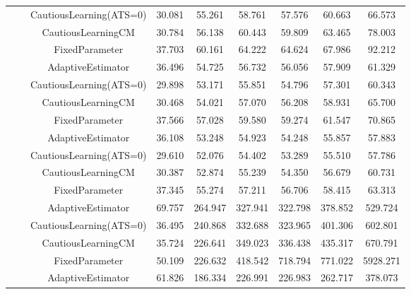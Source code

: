 \begin{table}[!h]
\begin{tabular}[t]{ccccccccc}
 &  & CautiousLearning(ATS=0) & 30.081 & 55.261 & 58.761 & 57.576 & 60.663 & 66.573\\

 &  & CautiousLearningCM & 30.784 & 56.138 & 60.443 & 59.809 & 63.465 & 78.003\\

 & \multirow[t]{-4}{*}{\centering\arraybackslash 1.00} & FixedParameter & 37.703 & 60.161 & 64.222 & 64.624 & 67.986 & 92.212\\
\cmidrule{2-9}
 &  & AdaptiveEstimator & 36.496 & 54.725 & 56.732 & 56.056 & 57.909 & 61.329\\

 &  & CautiousLearning(ATS=0) & 29.898 & 53.171 & 55.851 & 54.796 & 57.301 & 60.343\\

 &  & CautiousLearningCM & 30.468 & 54.021 & 57.070 & 56.208 & 58.931 & 65.700\\

 & \multirow[t]{-4}{*}{\centering\arraybackslash 1.25} & FixedParameter & 37.566 & 57.028 & 59.580 & 59.274 & 61.547 & 70.865\\
\cmidrule{2-9}
 &  & AdaptiveEstimator & 36.108 & 53.248 & 54.923 & 54.248 & 55.857 & 57.883\\

 &  & CautiousLearning(ATS=0) & 29.610 & 52.076 & 54.402 & 53.289 & 55.510 & 57.786\\

 &  & CautiousLearningCM & 30.387 & 52.874 & 55.239 & 54.350 & 56.679 & 60.731\\

\multirow[t]{-28}{*}{\centering\arraybackslash 50} & \multirow[t]{-4}{*}{\centering\arraybackslash 1.50} & FixedParameter & 37.345 & 55.274 & 57.211 & 56.706 & 58.415 & 63.313\\
\cmidrule{1-9}
 &  & AdaptiveEstimator & 69.757 & 264.947 & 327.941 & 322.798 & 378.852 & 529.724\\

 &  & CautiousLearning(ATS=0) & 36.495 & 240.868 & 332.688 & 323.965 & 401.306 & 602.801\\

 &  & CautiousLearningCM & 35.724 & 226.641 & 349.023 & 336.438 & 435.317 & 670.791\\

 & \multirow[t]{-4}{*}{\centering\arraybackslash 0.25} & FixedParameter & 50.109 & 226.632 & 418.542 & 718.794 & 771.022 & 5928.271\\
\cmidrule{2-9}
 &  & AdaptiveEstimator & 61.826 & 186.334 & 226.991 & 226.983 & 262.717 & 378.073\\


\end{tabular}
\end{table}
